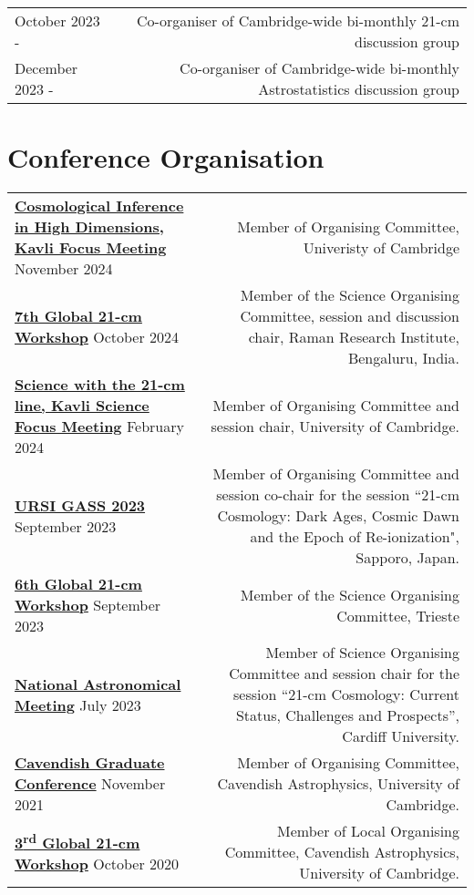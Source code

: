 \documentclass{article}
\begin{document}
\begin{tabular}{L!{\vrule}R}
    October 2023 - & Co-organiser of Cambridge-wide bi-monthly 21-cm discussion group \\
    December 2023 - & Co-organiser of Cambridge-wide bi-monthly Astrostatistics discussion group \\
\end{tabular}

\section*{Conference Organisation}

\begin{tabular}{l!{\vrule}r}
    \href{https://www.kicc.cam.ac.uk/events/kavli-science-themed-meetings/cosmological-inference-high-dimension}{\textbf{Cosmological Inference in High Dimensions, Kavli Focus Meeting}} November 2024 & Member of Organising Committee, Univeristy of Cambridge \\
    \href{https://sites.google.com/view/global-21-cm-workshop}{\textbf{7th Global 21-cm Workshop}} October 2024 & Member of the Science Organising Committee, session and discussion chair, Raman Research Institute, Bengaluru, India. \\
    \href{https://www.kicc.cam.ac.uk/events/kavli-science-themed-meetings/science-21-cm-hydrogen-line}{\textbf{Science with the 21-cm line, Kavli Science Focus Meeting}} February 2024 & Member of Organising Committee and session chair, University of Cambridge. \\
    \href{https://www.ursi-gass2023.jp}{\textbf{URSI GASS 2023}} September 2023 & Member of Organising Committee and session co-chair for the session ``21-cm Cosmology: Dark Ages, Cosmic Dawn and the Epoch of Re-ionization", Sapporo, Japan. \\
    \href{https://global21cmworkshop.org/2023-ifpu/}{\textbf{6th Global 21-cm Workshop}} September 2023 & Member of the Science Organising Committee, Trieste \\
    \href{https://nam2023.org}{\textbf{National Astronomical Meeting}} July 2023 & Member of Science Organising Committee and session chair for the session “21-cm Cosmology: Current Status, Challenges and Prospects”, Cardiff University. \\
	\href{http://cavgradcon.soc.srcf.net/index.html}{\textbf{Cavendish Graduate Conference}} November 2021 & Member of Organising Committee, Cavendish Astrophysics, University of Cambridge.\\
	\href{https://sites.google.com/view/third21cmglobalworkshop/home?authuser=0}{\textbf{3\textsuperscript{rd} Global 21-cm Workshop}} October 2020 & Member of Local Organising Committee, Cavendish Astrophysics, University of Cambridge.	
\end{tabular}
\end{document}
